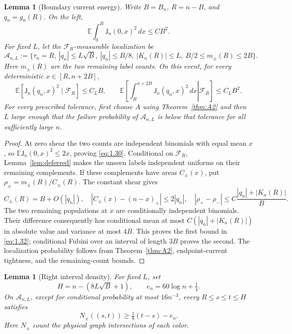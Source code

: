 \documentclass[11pt,reqno]{amsart}
\newtheorem{lemma}[theorem]{Lemma}
\theoremstyle{definition}
\theoremstyle{remark}
\numberwithin{equation}{section}
\newcommand{\E}{\mathbb E}
\begin{document}
\begin{lemma}[Boundary current energy]
\label{lem:boundary}
Write \(B=B_n\), \(R=n-B\), and \(q_n=g_n(R)\).  On the left,
\begin{equation}
\E\int_0^B\mathsf J_n(0,x)^2\,dx\le CB^2.
\label{eq:1.30}
\end{equation}
For fixed \(L\), let the \(\mathcal F_R\)-measurable localization be
\begin{equation}
\mathcal A_{n,L}:=
\{\tau_n=R,\ |q_n|\le L\sqrt B,\ |q_n|\le B/8,
\ |K_n(R)|\le L,\ B/2\le m_\pm(R)\le2B\}.
\label{eq:1.31}
\end{equation}
Here \(m_\pm(R)\) are the two remaining label counts.  On this event,
for every deterministic \(x\in[R,n+2B]\),
\begin{equation}
\E[\mathsf J_n(q_n,x)^2\mid\mathcal F_R]\le C_LB,
\qquad
\E\left[\left.\int_R^{n+2B}\mathsf J_n(q_n,x)^2\,dx
\right|\mathcal F_R\right]\le C_LB^2.
\label{eq:1.32}
\end{equation}
For every prescribed tolerance, first choose \(A\) using
Theorem~\ref{thm:A2} and then \(L\)
large enough that the failure probability of \(\mathcal A_{n,L}\) is
below that tolerance for all sufficiently large \(n\).
\end{lemma}

\begin{proof}
At zero shear the two counts are independent binomials with equal mean \(x\),
so \(\E\mathsf J_n(0,x)^2\le2x\), proving \eqref{eq:1.30}.
Conditional on \(\mathcal F_R\), Lemma~\ref{lem:deferred} makes the unseen
labels independent uniforms on their remaining complements.  If these
complements have areas \(C_\pm(x)\), put \(\rho_\pm=m_\pm(R)/C_\pm(R)\).
The constant shear gives
\begin{equation}
C_\pm(R)=B+O(|q_n|),\quad
|C_\pm(x)-(n-x)_+|\le2|q_n|,\quad
|\rho_+-\rho_-|\le C\frac{|q_n|+|K_n(R)|}{B}.
\label{eq:1.32a}
\end{equation}
The two remaining populations at \(x\) are conditionally independent
binomials.  Their difference consequently has conditional mean at most
\(C(|q_n|+|K_n(R)|)\) in absolute value and variance at most \(4B\).
This proves the first bound in \eqref{eq:1.32}; conditional Fubini over an interval
of length \(3B\) proves the second.  The localization probability follows
from Theorem~\ref{thm:A2}, endpoint-current tightness, and the remaining-count bounds.
\end{proof}

\begin{lemma}[Right interval density]
\label{lem:right-density}
For fixed \(L\), set
\begin{equation}
H=n-(8L\sqrt B+1),\qquad e_n=60\log n+\tfrac14.
\label{eq:1.33}
\end{equation}
On \(\mathcal A_{n,L}\), except for conditional probability at most
\(16n^{-3}\), every \(R\le s\le t\le H\) satisfies
\begin{equation}
N_\pm((s,t))\ge\tfrac18(t-s)-e_n.
\label{eq:1.34}
\end{equation}
Here \(N_\pm\) count the physical graph intersections of each color.
\end{lemma}
\end{document}
